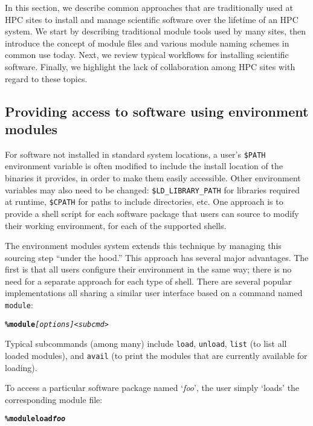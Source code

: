 In this section, we describe common approaches that are traditionally used at HPC
sites to install and manage scientific software over the lifetime of an HPC system.
We start by describing traditional module tools used by many sites, then introduce
the concept of module files and various module naming schemes in common use today.
Next, we review typical workflows for installing scientific software. Finally,
we highlight the lack of collaboration among HPC sites with regard to these topics.

\subsection{Providing access to software using environment modules}
\label{sec:env_modules_system}

For software not installed in standard system locations, a user's
\texttt{\small\$PATH} environment variable is often modified to include the install
location of the binaries it provides, in order to make them easily accessible.
Other environment variables may also need to be changed:
\texttt{\small\$LD\_LIBRARY\_PATH} for libraries required at runtime,
\texttt{\small\$CPATH} for paths to include directories, etc.
One approach is to provide a shell script for each software package that
users can source to modify their working environment, for each of the supported
shells.

The environment modules system extends this technique by managing this sourcing step ``under the hood.'' This approach has several major
advantages. The first is that all users configure their environment in the same way; there is no need for a
separate approach for each type of shell. There are several popular implementations
all sharing a similar
user interface based on a command named \texttt{\small module}:
{\small
\begin{alltt}
    \textbf{\% module} \emph{[options]} \emph{<subcmd>}\
\end{alltt}
}
\noindent
Typical subcommands (among many) include \texttt{\small load},
\texttt{\small unload}, \texttt{\small list} (to list all loaded
modules), and \texttt{\small avail} (to print the modules that are currently available for loading).

To access a particular software package named `\emph{foo}', the user simply
`loads' the corresponding module file:
{\small
\begin{alltt}
    \textbf{\% module load \emph{foo}}\
\end{alltt}
}

